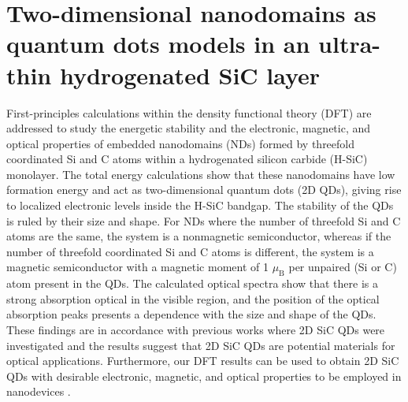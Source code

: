 \chapter{Two-dimensional nanodomains as quantum dots models in an ultra-thin hydrogenated SiC layer}

First-principles calculations within the density functional theory (DFT) are addressed to study the energetic stability and the electronic, magnetic, and optical properties of embedded nanodomains (NDs) formed by threefold coordinated Si and C atoms within a hydrogenated silicon carbide (H-SiC) monolayer. The total energy calculations show that these nanodomains have low formation energy and act as two-dimensional quantum dots (2D QDs), giving rise to localized electronic levels inside the H-SiC bandgap. The stability of the QDs is ruled by their size and shape. For NDs where the number of threefold Si and C atoms are the same, the system is a nonmagnetic semiconductor, whereas if the number of threefold coordinated Si and C atoms is different, the system is a magnetic semiconductor with a magnetic moment of 1 $\mu_{\text{B}}$ per unpaired (Si or C) atom present in the QDs. The calculated optical spectra show that there is a strong absorption optical in the visible region, and the position of the optical absorption peaks presents a dependence with the size and shape of the QDs. These findings are in accordance with previous works where 2D SiC QDs were investigated and the results suggest that 2D SiC QDs are potential materials for optical applications. Furthermore, our DFT results can be used to obtain 2D SiC QDs with desirable electronic, magnetic, and optical properties to be employed in nanodevices \cite{kremer2021two}.